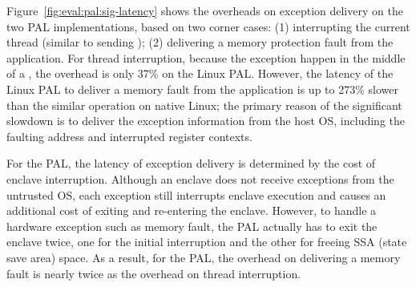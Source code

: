 Figure~\ref{fig:eval:pal:sig-latency} shows the overheads
on exception delivery
on the two PAL implementations,
based on two corner cases:
(1) interrupting the current thread (similar to sending );
(2) delivering a memory protection fault
from the application.
For thread interruption,
because the exception happen in the middle of a \hostapi{},
the overhead is only 37\%
on the Linux PAL.
However,
the latency of the Linux PAL
to deliver a memory fault from the application
is up to 273\% slower
than the similar operation on native Linux;
the primary reason of
the significant slowdown
is to deliver the exception information
from the host OS,
including the faulting address
and interrupted register contexts.








For the \sgx{} PAL,
the latency of exception delivery is determined
by the cost of enclave interruption.
Although an enclave does not receive exceptions from the untrusted OS, each exception still interrupts
enclave execution
and causes an additional cost
of exiting and re-entering the enclave.
However, to handle a hardware exception such as memory fault,
the \sgx{} PAL
actually has to exit the enclave twice,
one for the initial
interruption and
the other for freeing SSA (state save area) space.
As a result,
for the \sgx{} PAL,
the overhead on delivering a memory fault
is nearly twice as the overhead on thread interruption. 




